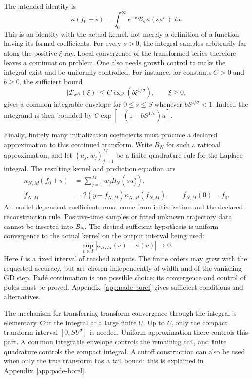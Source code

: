 The intended identity is
\begin{equation}
 \kappa(f_0+s)=\int_0^\infty e^{-u}
               \mathcal B_\sigma\kappa(su^\sigma)\,du.
 \label{eq:borel-actual-kernel}
\end{equation}
This is an identity with the actual kernel, not merely a definition of a
function having its formal coefficients.  For every $s>0$, the integral
samples arbitrarily far along the positive $\xi$-ray.  Local convergence of
the transformed series therefore leaves a continuation problem.  One also
needs growth control to make the integral exist and be uniformly controlled.
For instance, for constants $C>0$ and $b\ge0$, the sufficient bound
\[
 |\mathcal B_\sigma\kappa(\xi)|
 \le C\exp(b\xi^{1/\sigma}),\qquad \xi\ge0,
\]
gives a common integrable envelope for $0\le s\le S$ whenever
$bS^{1/\sigma}<1$.  Indeed the integrand is then bounded by
$C\exp[-(1-bS^{1/\sigma})u]$.

Finally, finitely many initialization coefficients must produce a declared
approximation to this continued transform.  Write $B_N$ for such a rational
approximation, and let $(u_j,w_j)_{j=1}^M$ be a finite quadrature rule for the
Laplace integral.  The resulting kernel and prediction equation are
\begin{align*}
 \kappa_{N,M}(f_0+s)&=\sum_{j=1}^M w_jB_N(su_j^\sigma),\\
 \dot f_{N,M}&=2(y-f_{N,M})\kappa_{N,M}(f_{N,M}),
 \qquad f_{N,M}(0)=f_0.
\end{align*}
All model-dependent coefficients must come from initialization and the
declared reconstruction rule.  Positive-time samples or fitted unknown
trajectory data cannot be inserted into $B_N$.  The desired sufficient
hypothesis is uniform convergence to the actual kernel on the output
interval being used:
\[
 \sup_{v\in I}|\kappa_{N,M}(v)-\kappa(v)|\longrightarrow0.
\]
Here $I$ is a fixed interval of reached outputs.  The finite orders may grow
with the requested accuracy, but are chosen independently of width and of
the vanishing GD step.  Pad\'e continuation is one possible choice; its
convergence and control of poles must be proved.  Appendix~\ref{app:pade-borel}
gives sufficient conditions and alternatives.

The mechanism for transferring transform convergence through the integral
is elementary.  Cut the integral at a large finite $U$.  Up to $U$, only
the compact transform interval $[0,SU^\sigma]$ is needed.  Uniform
approximation there controls this part.  A common integrable envelope
controls the remaining tail, and finite quadrature controls the compact
integral.  A cutoff construction can also be used when only the true
transform has a tail bound; this is explained in Appendix~\ref{app:pade-borel}.

